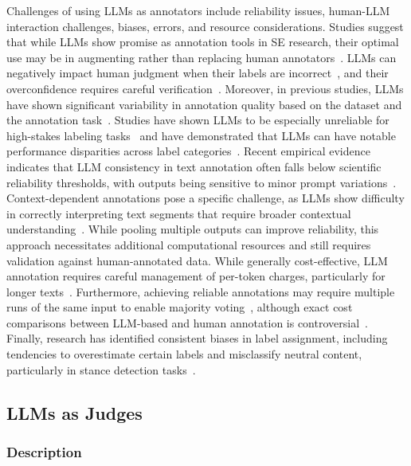Challenges of using LLMs as annotators include reliability issues, human-LLM interaction challenges, biases, errors, and resource considerations.
Studies suggest that while LLMs show promise as annotation tools in SE research, their optimal use may be in augmenting rather than replacing human annotators~\cite{DBLP:conf/emnlp/WangLXZZ21, DBLP:conf/chi/HeHDRH24}.
LLMs can negatively impact human judgment when their labels are incorrect~\cite{DBLP:conf/www/HuangKA23a}, and their overconfidence requires careful verification~\cite{DBLP:conf/kdd/WanSJKCNSSWYABJ24}.
Moreover, in previous studies, LLMs have shown significant variability in annotation quality based on the dataset and the annotation task~\cite{DBLP:journals/corr/abs-2306-00176}. Studies have shown LLMs to be especially unreliable for high-stakes labeling tasks~\cite{DBLP:conf/chi/Wang0RMM24} and have demonstrated that LLMs can have notable performance disparities across label categories~\cite{DBLP:journals/corr/abs-2304-10145}. Recent empirical evidence indicates that LLM consistency in text annotation often falls below scientific reliability thresholds, with outputs being sensitive to minor prompt variations~\cite{DBLP:journals/corr/abs-2304-11085}.
Context-dependent annotations pose a specific challenge, as LLMs show difficulty in correctly interpreting text segments that require broader contextual understanding~\cite{DBLP:conf/chi/HeHDRH24}.
While pooling multiple outputs can improve reliability, this approach necessitates additional computational resources and still requires validation against human-annotated data.
While generally cost-effective, LLM annotation requires careful management of per-token charges, particularly for longer texts~\cite{DBLP:conf/emnlp/WangLXZZ21}. Furthermore, achieving reliable annotations may require multiple runs of the same input to enable majority voting~\cite{DBLP:journals/corr/abs-2304-11085}, although exact cost comparisons between LLM-based and human annotation is controversial~\cite{DBLP:conf/chi/HeHDRH24}.
Finally, research has identified consistent biases in label assignment, including tendencies to overestimate certain labels and misclassify neutral content, particularly in stance detection tasks~\cite{DBLP:journals/corr/abs-2304-10145}.


\subsection{LLMs as Judges}

\subsubsection{Description}

